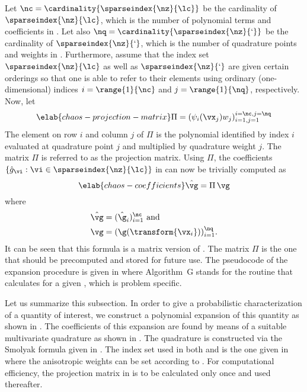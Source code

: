 Let $\nc = \cardinality{\sparseindex{\nz}{\lc}}$ be the cardinality of
$\sparseindex{\nz}{\lc}$, which is the number of polynomial terms and
coefficients in . Let also $\nq =
\cardinality{\sparseindex{\nz}{\lq}}$ be the cardinality of
$\sparseindex{\nz}{\lq}$, which is the number of quadrature points and weights
in . Furthermore, assume that the index set
$\sparseindex{\nz}{\lc}$ as well as $\sparseindex{\nz}{\lq}$ are given certain
orderings so that one is able to refer to their elements using ordinary
(one-dimensional) indices $i = \range{1}{\nc}$ and $j = \range{1}{\nq}$,
respectively. Now, let
\begin{equation} \elab{chaos-projection-matrix}
  \Pi = (\psi_i(\vx_j) w_j)_{i = 1, j = 1}^{i = \nc, j = \nq}
\end{equation}
The element on row $i$ and column $j$ of $\Pi$ is the polynomial identified by
index $i$ evaluated at quadrature point $j$ and multiplied by quadrature weight
$j$. The matrix $\Pi$ is referred to as the projection matrix. Using $\Pi$, the
coefficients $\{ \hat{g}_{\vi}: \vi \in \sparseindex{\nz}{\lc} \}$ in
 can now be trivially computed as
\begin{equation} \elab{chaos-coefficients}
  \hat{\vg} = \Pi \, \vg
\end{equation}
where
\begin{align*}
  & \hat{\vg} = (\hat{\g}_i)_{i = 1}^\nc \text{ and} \\
  & \vg = (\g(\transform{\vx_i}))_{i = 1}^\nq.
\end{align*}
It can be seen that this formula is a matrix version of
. The matrix $\Pi$ is the one that should be precomputed
and stored for future use. The pseudocode of the expansion procedure is given in
 where Algorithm~G stands for the routine that
calculates \g for a given \vu, which is problem specific.

Let us summarize this subsection. In order to give a probabilistic
characterization of a quantity of interest, we construct a polynomial expansion
of this quantity as shown in . The coefficients of this
expansion are found by means of a suitable multivariate quadrature as shown in
. The quadrature is constructed via the Smolyak formula
given in . The index set used in both
 and  is the one given in
 where the anisotropic weights can be set
according to . For computational efficiency, the
projection matrix in  is to be calculated only
once and used thereafter.

